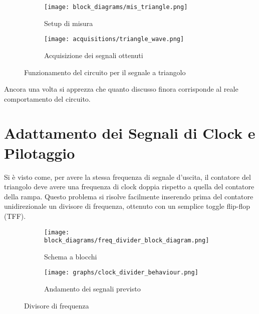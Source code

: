 \begin{figure}[H]
    \centering

    \begin{subfigure}{.5\textwidth}
        \centering
        \texttt{[image: block\_diagrams/mis\_triangle.png]}
        \caption{Setup di misura}
        \label{mis_triangle}
    \end{subfigure}%
    \begin{subfigure}{.5\textwidth}
        \centering
        \texttt{[image: acquisitions/triangle\_wave.png]}
        \caption{Acquisizione dei segnali ottenuti}
        \label{acq_triangle}
    \end{subfigure}

    \caption{Funzionamento del circuito per il segnale a triangolo}
    \label{acq_triangle_signals}
\end{figure}

Ancora una volta si apprezza che quanto discusso finora corrisponde al reale comportamento
del circuito.


\section{Adattamento dei Segnali di Clock e Pilotaggio}


Si è visto come, per avere la stessa frequenza di segnale d'uscita, il contatore del
triangolo deve avere una frequenza di clock doppia rispetto a quella del contatore della
rampa. Questo problema si risolve facilmente inserendo prima del contatore unidirezionale
un divisore di frequenza, ottenuto con un semplice toggle flip-flop (TFF).

\begin{figure}[H]
    \centering

    \begin{subfigure}{.5\textwidth}
        \centering
        \texttt{[image: block\_diagrams/freq\_divider\_block\_diagram.png]}
        \caption{Schema a blocchi}
        \label{freq_divider_block_diagram}
    \end{subfigure}%
    \begin{subfigure}{.5\textwidth}
        \centering
        \texttt{[image: graphs/clock\_divider\_behaviour.png]}
        \caption{Andamento dei segnali previsto}
        \label{clock_divider_behaviour}
    \end{subfigure}

    \caption{Divisore di frequenza}
\end{figure}


